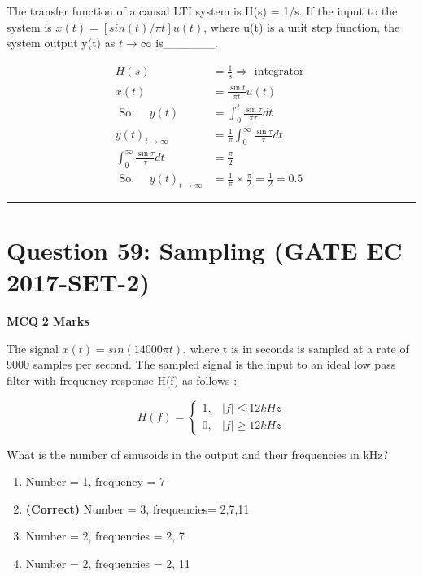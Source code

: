 \documentclass[11pt,a4paper]{article}
\begin{document}
\noindent The transfer function of a causal LTI system is H(s) = 1/s. If the input to the system is $x(t) =[sin(t) / \pi t] u(t)$, where u(t) is a unit step function, the system output y(t) as  $t \rightarrow \infty$ is\_\_\_\_\_\_.


\begin{tcolorbox}[solbox, title=Detailed Solution -- Question 58]
\[
\begin{aligned} H(s) &=\frac{1}{s} \Rightarrow \text { integrator } \\ x(t) &=\frac{\sin t}{\pi t} u(t) \\ \text { So. } \quad y(t) &=\int_{0}^{t} \frac{\sin \tau}{\pi \tau} d t \\ y(t)_{t \rightarrow \infty} &=\frac{1}{\pi} \int_{0}^{\infty} \frac{\sin \tau}{\tau} d t \\ \int_{0}^{\infty} \frac{\sin \tau}{\tau} d t &=\frac{\pi}{2} \\ \text { So. } \quad y(t)_{t \rightarrow \infty} &=\frac{1}{\pi} \times \frac{\pi}{2}=\frac{1}{2}=0.5 \end{aligned}
\]
\end{tcolorbox}

\vspace{1.5em}
\hrule
\vspace{1.5em}

\section*{Question 59: Sampling (GATE EC 2017-SET-2)}
\noindent \textbf{\color{primary}MCQ} \hfill \textbf{\color{secondary}2 Marks}


\noindent The signal $x(t)=sin(14000\pi t)$, where t is in seconds is sampled at a rate of 9000 samples per second. The sampled signal is the input to an ideal low pass filter with frequency response H(f) as follows :   
 
\[
H(f)=\left\{\begin{matrix} 1, & |f|\leq 12 kHz\\ 0, & |f|\geq 12 kHz \end{matrix}\right.
\]
  
  What is the number of sinusoids in the output and their frequencies in kHz?


\begin{enumerate}[label=(\Alph*)]
    \item Number = 1, frequency = 7
    \item \textbf{(Correct)} Number = 3, frequencies= 2,7,11
    \item Number = 2, frequencies = 2, 7
    \item Number = 2, frequencies = 2, 11
\end{enumerate}
\end{document}
